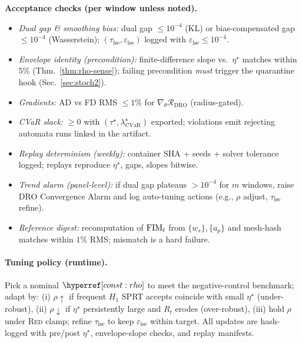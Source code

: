 \begin{mdframed}
\textbf{Acceptance checks (per window unless noted).}
\begin{itemize}[leftmargin=*]
\item \emph{Dual gap \& smoothing bias:} dual gap $\le 10^{-4}$ (KL) or bias-compensated gap $\le 10^{-4}$ (Wasserstein); $(\tau_{\mathrm{lse}},\varepsilon_{\mathrm{lse}})$ logged with $\varepsilon_{\mathrm{lse}}\le 10^{-4}$.
\item \emph{Envelope identity (precondition):} finite-difference slope vs.\ $\eta^\star$ matches within $5\%$ (Thm.~\ref{thm:rho-sense}); failing precondition \emph{must} trigger the quarantine hook (Sec.~\ref{sec:stoch2}).
\item \emph{Gradients:} AD vs FD RMS $\le 1\%$ for $\nabla_\theta \mathcal R_{\mathrm{DRO}}$ (radius-gated).
\item \emph{CVaR slack:} $\ge 0$ with $(\tau^\star,\lambda_{\mathrm{CVaR}}^\star)$ exported; violations emit rejecting automata runs linked in the artifact.
\item \emph{Replay determinism (weekly):} container SHA + seeds + solver tolerance logged; replays reproduce $\eta^\star$, gaps, slopes bitwise.
\item \emph{Trend alarm (panel-level):} if dual gap plateaus $>10^{-4}$ for $m$ windows, raise \textsf{DRO Convergence Alarm} and log auto-tuning actions (e.g., $\rho$ adjust, $\tau_{\mathrm{lse}}$ refine).
\item \emph{Reference digest:} recomputation of $\mathrm{FIM}_t$ from $\{w_s\},\{a_p\}$ and mesh-hash matches within $1\%$ RMS; mismatch is a hard failure.
\end{itemize}
\end{mdframed}

\paragraph{Tuning policy (runtime).}
Pick a nominal $\constref{rho}$ to meet the negative-control benchmark; adapt by:
(i) $\rho\uparrow$ if frequent $H_1$ SPRT accepts coincide with small $\eta^\star$ (under-robust),
(ii) $\rho\downarrow$ if $\eta^\star$ persistently large and $R_t$ erodes (over-robust),
(iii) hold $\rho$ under \textsc{Red} clamp; refine $\tau_{\mathrm{lse}}$ to keep $\varepsilon_{\mathrm{lse}}$ within target.
All updates are hash-logged with pre/post $\eta^\star$, envelope-slope checks, and replay manifests.
